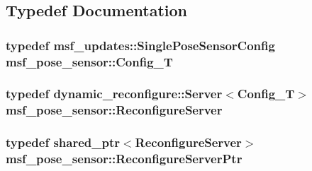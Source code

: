 \subsection{Typedef Documentation}
\hypertarget{namespacemsf__pose__sensor_a1d993c8c6010718666c4e9dc159bd3dd}{
\subsubsection[{Config\-\_\-\-T}]{\setlength{\rightskip}{0pt plus 5cm}typedef msf\-\_\-updates\-::\-Single\-Pose\-Sensor\-Config {\bf msf\-\_\-pose\-\_\-sensor\-::\-Config\-\_\-\-T}}}\label{namespacemsf__pose__sensor_a1d993c8c6010718666c4e9dc159bd3dd}
\hypertarget{namespacemsf__pose__sensor_aa4588c7571ac356c58a2bc818dc3c09b}{
\subsubsection[{Reconfigure\-Server}]{\setlength{\rightskip}{0pt plus 5cm}typedef dynamic\-\_\-reconfigure\-::\-Server$<${\bf Config\-\_\-\-T}$>$ {\bf msf\-\_\-pose\-\_\-sensor\-::\-Reconfigure\-Server}}}\label{namespacemsf__pose__sensor_aa4588c7571ac356c58a2bc818dc3c09b}
\hypertarget{namespacemsf__pose__sensor_a00a515ed2b3f3664f6db2ab912956d05}{
\subsubsection[{Reconfigure\-Server\-Ptr}]{\setlength{\rightskip}{0pt plus 5cm}typedef shared\-\_\-ptr$<${\bf Reconfigure\-Server}$>$ {\bf msf\-\_\-pose\-\_\-sensor\-::\-Reconfigure\-Server\-Ptr}}}\label{namespacemsf__pose__sensor_a00a515ed2b3f3664f6db2ab912956d05}

